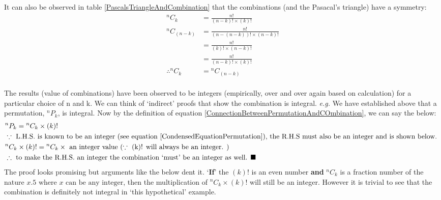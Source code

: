 \documentclass[10pt, twoside]{article}
\newcommand*{\Permutation}[2]{{}^{#1}P_{#2}}%
\newcommand*{\Combination}[2]{{}^{#1}C_{#2}}%
\begin{document}
	  It can also be observed in table \ref{PascalsTriangleAndCombination} that the combinations (and the Pasacal's triangle) have a symmetry:
	  \begin{align*}
	   	\Combination{n}{k} &= \frac{n!}{(n-k)!\times(k)!} \\
	   	\Combination{n}{(n-k)} &= \frac{n!}{(n-(n-k))!\times(n-k)!} \\
	   	&= \frac{n!}{{(k)!}\times(n-k)!} \\
	   	&= \frac{n!}{(n-k)!\times(k)!} \\
	   	\therefore \Combination{n}{k} &= \Combination{n}{(n-k)}  
	  \end{align*}
	\paragraph{} The results (value of combinations) have been observed to be integers (empirically, over and over again based on calculation) for a particular choice of n and k. We can think of `indirect' proofs that show the combination is integral. \textit{e.g.} We have established above that a permutation, $\Permutation{n}{k}$, is integral. Now by the definition of equation \eqref{ConnectionBetweenPermutationAndCOmbination}, we can say the below:
	\begin{align*}
	   & \Permutation{n}{k} = \Combination{n}{k} \times (k)! \\
	   & \because \text{ L.H.S. is known to be an integer (see equation \eqref{CondensedEquationPermutation}), the R.H.S must also be an integer and is shown below. } \\
	   & \Combination{n}{k} \times (k)! = \Combination{n}{k} \times \text{ an integer value } (\because \text{ (k)! will always be an integer. }) \\
	   & \therefore \text{ to make the R.H.S. an integer the combination `must' be an integer as well. } \blacksquare 
	\end{align*}
	The proof looks promising but arguments like the below dent it. `\textbf{If}' the $(k)!$ is an even number \textbf{and} $\Combination{n}{k}$ is a fraction number of the nature $x.5 \text{ where $x$ can be any integer}$, then the multiplication of $\Combination{n}{k}\times (k)!$ will still be an integer. However it is trivial to see that the combination is definitely not integral in `this hypothetical' example.
	
\end{document}
